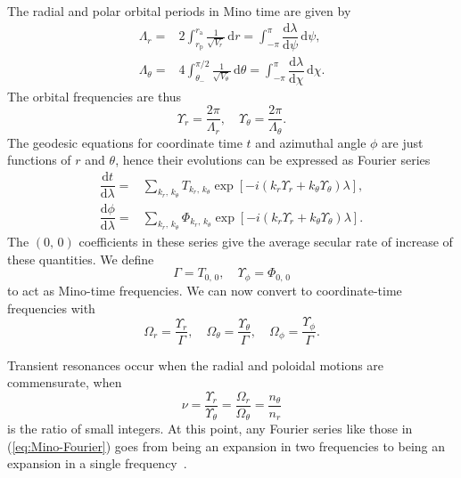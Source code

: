 \documentclass[aps,prd,amsfonts,amssymb,amsmath,nofootinbib,showpacs,superscriptaddress,twocolumn]{revtex4}
\newcommand{\eqnref}[1]{(\ref{eq:#1})}
\newcommand{\sub}[1]{\ensuremath{_\mathrm{#1}}}
\newcommand{\dd}{\ensuremath{\mathrm{d}}}
\newcommand{\diff}[2]{\ensuremath{\dfrac{\dd {#1}}{\dd {#2}}}}
\newcommand{\recip}[1]{\ensuremath{\frac{1}{#1}}}
\newcommand{\intd}[4]{\ensuremath{\int_{#1}^{#2}{#3}\,\dd{#4}}}
\begin{document}
The radial and polar orbital periods in Mino time are given by
\begin{subequations}
\begin{align}
\Lambda_r = {} & 2\intd{r\sub{p}}{r\sub{a}}{\recip{\sqrt{V_r}}}{r} = \intd{-\pi}{\pi}{\diff{\lambda}{\psi}}{\psi}, \\
\Lambda_\theta = {} & 4\intd{\theta_-}{\pi/2}{\recip{\sqrt{V_\theta}}}{\theta} = \intd{-\pi}{\pi}{\diff{\lambda}{\chi}}{\chi}.
\end{align}
\end{subequations}
The orbital frequencies are thus
\begin{equation}
\Upsilon_r = \frac{2\pi}{\Lambda_r}, \quad \Upsilon_\theta = \frac{2\pi}{\Lambda_\theta}.
\end{equation}
The geodesic equations for coordinate time $t$ and azimuthal angle $\phi$ are just functions of $r$ and $\theta$, hence their evolutions can be expressed as Fourier series~\cite{Drasco2004}
\begin{subequations}
\begin{align}
\diff{t}{\lambda} = {} & \sum_{k_r,\,k_\theta}T_{k_r,\, k_\theta}\exp\left[-i\left(k_r\Upsilon_r + k_\theta\Upsilon_\theta\right)\lambda\right], \\
\diff{\phi}{\lambda} = {} & \sum_{k_r,\,k_\theta}\Phi_{k_r,\, k_\theta}\exp\left[-i\left(k_r\Upsilon_r + k_\theta\Upsilon_\theta\right)\lambda\right].
\label{eq:Mino-Fourier}
\end{align}
\end{subequations}
The $(0,\,0)$ coefficients in these series give the average secular rate of increase of these quantities. We define
\begin{equation}
\Gamma = T_{0,\,0}, \quad \Upsilon_\phi = \Phi_{0,\,0}
\end{equation}
to act as Mino-time frequencies. We can now convert to coordinate-time frequencies with
\begin{equation}
\Omega_r = \frac{\Upsilon_r}{\Gamma}, \quad \Omega_\theta = \frac{\Upsilon_\theta}{\Gamma}, \quad \Omega_\phi = \frac{\Upsilon_\phi}{\Gamma}.
\end{equation}

Transient resonances occur when the radial and poloidal motions are commensurate, when
\begin{equation}
\nu = \frac{\Upsilon_r}{\Upsilon_\theta} = \frac{\Omega_r}{\Omega_\theta} = \frac{n_\theta}{n_r}
\end{equation}
is the ratio of small integers. At this point, any Fourier series like those in \eqnref{Mino-Fourier} goes from being an expansion in two frequencies to being an expansion in a single frequency~\cite{Bosley1992}.
\end{document}
